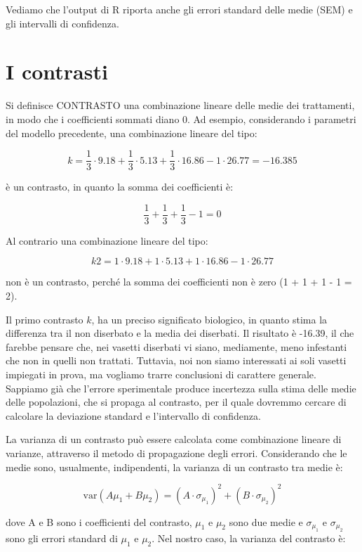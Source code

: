 \documentclass[a4paper,12pt,oneside]{book}
\begin{document}
Vediamo che l'output di R riporta anche gli errori standard delle medie (SEM) e gli intervalli di confidenza.

\hypertarget{i-contrasti}{%
\section{I contrasti}\label{i-contrasti}}

Si definisce CONTRASTO una combinazione lineare delle medie dei trattamenti, in modo che i coefficienti sommati diano 0. Ad esempio, considerando i parametri del modello precedente, una combinazione lineare del tipo:

\[k = \frac{1}{3} \cdot 9.18 + \frac{1}{3} \cdot 5.13 + \frac{1}{3} \cdot 16.86 - 1 \cdot 26.77  = -16.385\]

è un contrasto, in quanto la somma dei coefficienti è:

\[\frac{1}{3} + \frac{1}{3} + \frac{1}{3} - 1 = 0\]

Al contrario una combinazione lineare del tipo:

\[k2 = 1 \cdot 9.18 + 1 \cdot 5.13 + 1 \cdot 16.86 - 1 \cdot 26.77\]

non è un contrasto, perché la somma dei coefficienti non è zero (1 + 1 + 1 - 1 = 2).

Il primo contrasto \(k\), ha un preciso significato biologico, in quanto stima la differenza tra il non diserbato e la media dei diserbati. Il risultato è -16.39, il che farebbe pensare che, nei vasetti diserbati vi siano, mediamente, meno infestanti che non in quelli non trattati. Tuttavia, noi non siamo interessati ai soli vasetti impiegati in prova, ma vogliamo trarre conclusioni di carattere generale. Sappiamo già che l'errore sperimentale produce incertezza sulla stima delle medie delle popolazioni, che si propaga al contrasto, per il quale dovremmo cercare di calcolare la deviazione standard e l'intervallo di confidenza.

La varianza di un contrasto può essere calcolata come combinazione lineare di varianze, attraverso il metodo di propagazione degli errori. Considerando che le medie sono, usualmente, indipendenti, la varianza di un contrasto tra medie è:

\[\textrm{var}(A \mu_1 + B \mu_2) = (A \cdot \sigma_{\mu_1} )^{2}  + (B \cdot \sigma_{\mu_2} ) ^ 2\]

dove A e B sono i coefficienti del contrasto, \(\mu_1\) e \(\mu_2\) sono due medie e \(\sigma_{\mu_1}\) e \(\sigma_{\mu_2}\) sono gli errori standard di \(\mu_1\) e \(\mu_2\). Nel nostro caso, la varianza del contrasto è:
\end{document}
